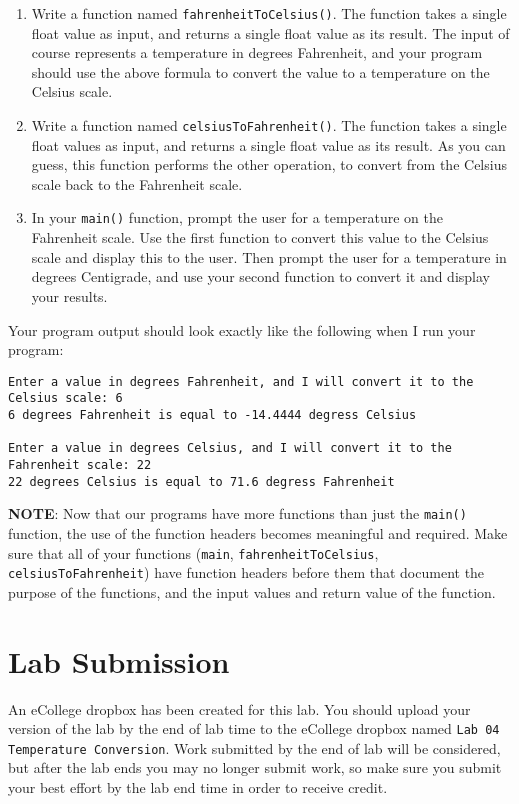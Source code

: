 \documentclass[11pt]{article}
\begin{document}
\begin{enumerate}
\item Write a function named \verb~fahrenheitToCelsius()~.  The function takes
   a single float value as input, and returns a single float value
   as its result.  The input of course represents a temperature in
   degrees Fahrenheit, and your program should use the above formula
   to convert the value to a temperature on the Celsius scale.
\item Write a function named \verb~celsiusToFahrenheit()~.  The function
   takes a single float values as input, and returns a single float
   value as its result.  As you can guess, this function performs
   the other operation, to convert from the Celsius scale back to
   the Fahrenheit scale.
\item In your \verb~main()~ function, prompt the user for a temperature on
   the Fahrenheit scale.  Use the first function to convert this value
   to the Celsius scale and display this to the user.  Then 
   prompt the user for a temperature in degrees Centigrade, and use your
   second function to convert it and display your results.
\end{enumerate}

Your program output should look exactly like the following when I
run your program:


\begin{verbatim}
Enter a value in degrees Fahrenheit, and I will convert it to the Celsius scale: 6
6 degrees Fahrenheit is equal to -14.4444 degress Celsius

Enter a value in degrees Celsius, and I will convert it to the Fahrenheit scale: 22
22 degrees Celsius is equal to 71.6 degress Fahrenheit
\end{verbatim}

\textbf{NOTE}: Now that our programs have more functions than just the
\verb~main()~ function, the use of the function headers becomes meaningful
and required.  Make sure that all of your functions (\verb~main~,
\verb~fahrenheitToCelsius~, \verb~celsiusToFahrenheit~) have function headers
before them that document the purpose of the functions, and the input
values and return value of the function.
\section*{Lab Submission}
\label{sec-4}


An eCollege dropbox has been created for this lab.  You should
upload your version of the lab by the end of lab time to the eCollege
dropbox named \verb~Lab 04 Temperature Conversion~.  Work submitted by the end
of lab will be considered, but after the lab ends you may no longer
submit work, so make sure you submit your best effort by the lab end
time in order to receive credit.
\end{document}

